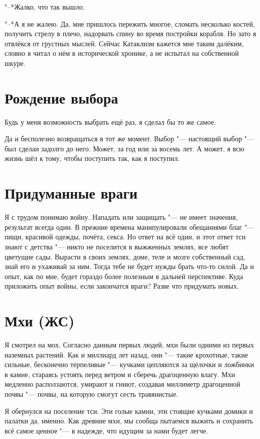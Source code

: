 \documentclass[a4paper,10pt,fleqn]{book}
\newcommand{\ldotst}{\so{...}\xspace}
\begin{document}
"--*Жалко, что так вышло.

"--*А я не жалею.
Да, мне пришлось пережить многое, сломать несколько костей, получить стрелу в плечо, надорвать спину во время постройки корабля.
Но зато я отвлёкся от грустных мыслей.
Сейчас Катаклизм кажется мне таким далёким, словно я читал о нём в исторической хронике, а не испытал на собственной шкуре.

\section{Рождение выбора}

Будь у меня возможность выбрать ещё раз, я сделал бы то же самое.

Да и бесполезно возвращаться в тот же момент.
Выбор "--- настоящий выбор "--- был сделан задолго до него.
Может, за год или за восемь лет.
А может, я всю жизнь шёл к тому, чтобы поступить так, как я поступил.

\section{Придуманные враги}

Я с трудом понимаю войну.
Нападать или защищать "--- не имеет значения, результат всегда один.
В прежние времена манипулировали обещаниями благ "--- пищи, красивой одежды, почёта, секса.
Но ответ на всё один, и этот ответ тси знают с детства "--- никто не поселится в выжженных землях, все любят цветущие сады.
Вырасти в своих землях, доме, теле и мозге собственный сад, знай его и ухаживай за ним.
Тогда тебе не будет нужды брать что-то силой.
Да и опыт, как по мне, будет гораздо более полезным в дальней перспективе.
Куда приложить опыт войны, если закончатся враги?
Разве что придумать новых.

\section{Мхи (ЖС)}

Я смотрел на мох.
Согласно данным первых людей, мхи были одними из первых наземных растений.
Как и миллиард лет назад, они "--- такие крохотные, такие сильные, бесконечно терпеливые "--- кучками цепляются за щёлочки и ложбинки в камне, стараясь устоять перед ветром и сберечь драгоценную влагу.
Мхи медленно расползаются, умирают и гниют, создавая миллиметр драгоценной почвы "--- почвы, на которую смогут сесть травянистые.

Я обернулся на поселение тси.
Эти голые камни, эти стоящие кучками домики и палатки\ldotst да, именно.
Как древние мхи, мы сообща пытаемся выжить и сохранить всё самое ценное "--- в надежде, что идущим за нами будет легче.
\end{document}
